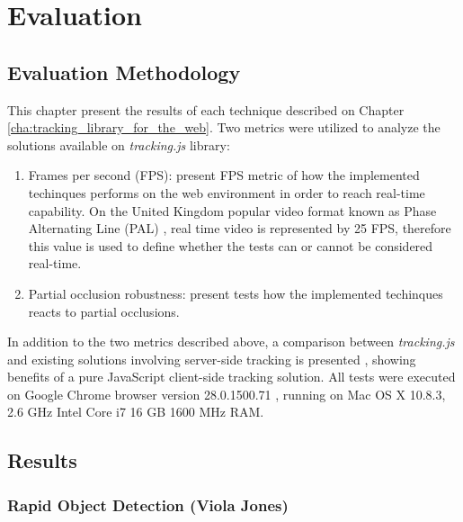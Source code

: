 \chapter{Evaluation} %
\label{cha:evaluation}

\section{Evaluation Methodology} %
\label{sec:evaluation:evaluation_methodology}

This chapter present the results of each technique described on Chapter \ref{cha:tracking_library_for_the_web}. Two metrics were utilized to analyze the solutions available on \textit{tracking.js} library:

\begin{enumerate}
	\item Frames per second (FPS): present FPS metric of how the implemented techinques performs on the web environment in order to reach real-time capability. On the United Kingdom popular video format known as Phase Alternating Line (PAL) \cite{PAL1962}, real time video is represented by 25 FPS, therefore this value is used to define whether the tests can or cannot be considered real-time.
	\item Partial occlusion robustness: present tests how the implemented techinques reacts to partial occlusions.
\end{enumerate}

In addition to the two metrics described above, a comparison between \textit{tracking.js} and existing solutions involving server-side tracking is presented \cite{Pablo2013}, showing benefits of a pure JavaScript client-side tracking solution.
All tests were executed on Google Chrome browser version 28.0.1500.71 \cite{Chrome2010}, running on Mac OS X 10.8.3, 2.6 GHz Intel Core i7 16 GB 1600 MHz RAM.


\section{Results} %
\label{sec:evaluation:results}

\subsection{Rapid Object Detection (Viola Jones)} %
\label{sec:evaluation:results:rapid_object_detection}

